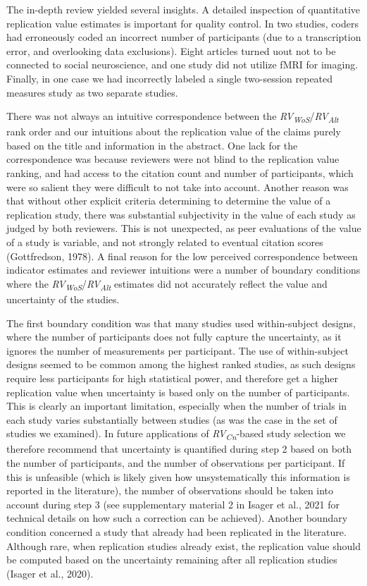 \documentclass[
  man,floatsintext]{apa6}
\begin{document}
The in-depth review yielded several insights. A detailed inspection of quantitative replication value estimates is important for quality control. In two studies, coders had erroneously coded an incorrect number of participants (due to a transcription error, and overlooking data exclusions). Eight articles turned uout not to be connected to social neuroscience, and one study did not utilize fMRI for imaging. Finally, in one case we had incorrectly labeled a single two-session repeated measures study as two separate studies.

There was not always an intuitive correspondence between the \emph{RV\textsubscript{WoS}}/\emph{RV\textsubscript{Alt}} rank order and our intuitions about the replication value of the claims purely based on the title and information in the abstract. One lack for the correspondence was because reviewers were not blind to the replication value ranking, and had access to the citation count and number of participants, which were so salient they were difficult to not take into account. Another reason was that without other explicit criteria determining to determine the value of a replication study, there was substantial subjectivity in the value of each study as judged by both reviewers. This is not unexpected, as peer evaluations of the value of a study is variable, and not strongly related to eventual citation scores (Gottfredson, 1978). A final reason for the low perceived correspondence between indicator estimates and reviewer intuitions were a number of boundary conditions where the \emph{RV\textsubscript{WoS}}/\emph{RV\textsubscript{Alt}} estimates did not accurately reflect the value and uncertainty of the studies.

The first boundary condition was that many studies used within-subject designs, where the number of participants does not fully capture the uncertainty, as it ignores the number of measurements per participant. The use of within-subject designs seemed to be common among the highest ranked studies, as such designs require less participants for high statistical power, and therefore get a higher replication value when uncertainty is based only on the number of participants. This is clearly an important limitation, especially when the number of trials in each study varies substantially between studies (as was the case in the set of studies we examined). In future applications of \emph{RV\textsubscript{Cn}}-based study selection we therefore recommend that uncertainty is quantified during step 2 based on both the number of participants, and the number of observations per participant. If this is unfeasible (which is likely given how unsystematically this information is reported in the literature), the number of observations should be taken into account during step 3 (see supplementary material 2 in Isager et al., 2021 for technical details on how such a correction can be achieved). Another boundary condition concerned a study that already had been replicated in the literature. Although rare, when replication studies already exist, the replication value should be computed based on the uncertainty remaining after all replication studies (Isager et al., 2020).
\end{document}
